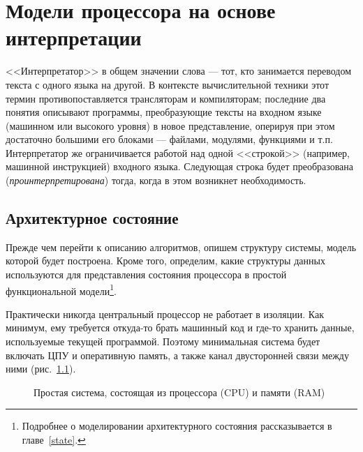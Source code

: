\chapter{Модели процессора на основе интерпретации}\label{interpretation}



<<Интерпретатор>> в общем значении слова --- тот, кто занимается переводом текста с одного языка на другой. В контексте вычислительной техники этот термин противопоставляется трансляторам и компиляторам; последние два понятия описывают программы, преобразующие тексты на входном языке (машинном или высокого уровня) в новое представление, оперируя при этом достаточно большими его блоками --- файлами, модулями, функциями и т.п. Интерпретатор же ограничивается работой над одной <<строкой>> (например, машинной инструкцией) входного языка. Следующая строка будет преобразована (\emph{проинтерпретирована}) тогда, когда в этом возникнет необходимость.

\section{Архитектурное состояние}

Прежде чем перейти к описанию алгоритмов, опишем структуру системы, модель которой будет построена. Кроме того, определим, какие структуры данных используются для представления состояния процессора в простой функциональной модели\footnote{Подробнее о моделировании архитектурного состояния рассказывается в главе~\ref{state}.}.

Практически никогда центральный процессор не работает в изоляции. Как минимум, ему требуется откуда-то брать машинный код и где-то хранить данные, используемые текущей программой. Поэтому минимальная система будет включать ЦПУ и оперативную память, а также канал двусторонней связи между ними (рис.~\ref{fig:cpu-mem}).

\begin{figure}[htb]
    \centering
    \caption{Простая система, состоящая из процессора (CPU) и памяти (RAM)}
    \label{fig:cpu-mem}
\end{figure}

